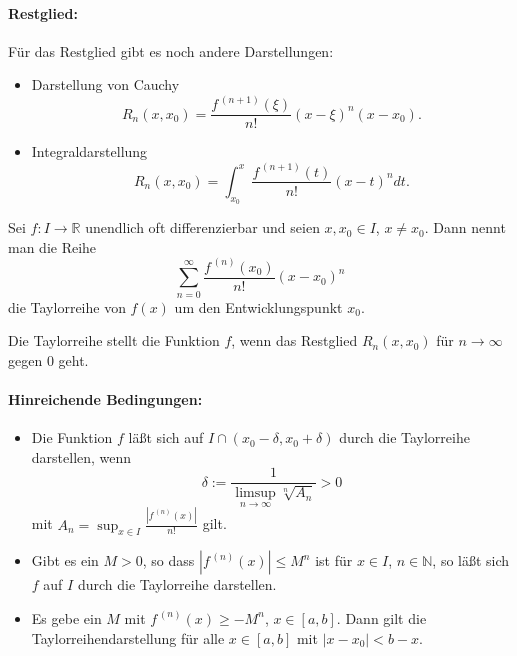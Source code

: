 \documentclass[a4paper,12pt,DIV15]{scrartcl}
\begin{document}
\paragraph{Restglied:}
Für das Restglied gibt es noch andere Darstellungen:
\begin{itemize}
\item Darstellung von {\color{red}Cauchy}
\[ R_n(x,x_0)= \frac{f^{\,(n+1)}(\xi)}{n!} (x- \xi)^{n}(x-x_0).\]
\item {\color{red}Integraldarstellung}
\[ R_n(x,x_0)= \int_{x_0}^x \frac{f^{\,(n+1)}(t)}{n!}  (x-t)^n dt.\]
\end{itemize}

\begin{defn}[Taylorreihe]
Sei $f:I \rightarrow \mathbb{R}$ unendlich oft  differenzierbar und seien
$x,x_0 \in I$, $x \neq x_0$. Dann nennt man die Reihe
\[ \sum_{n=0}^\infty \frac{f^{\,(n)}(x_0)}{n!}(x-x_0)^n \]
die {\color{red} Taylorreihe} von $f(x)$ um den Entwicklungspunkt
{\color{red} $x_0$}.

\bigskip
Die Taylorreihe stellt die Funktion $f$, wenn das Restglied $R_n(x,x_0)$ für $n
\rightarrow \infty$ gegen $0$ geht.
\end{defn}

\paragraph{Hinreichende Bedingungen:}
\begin{itemize}
\item Die Funktion $f$ läßt sich auf $I\cap (x_0-\delta, x_0+\delta)$ durch die Taylorreihe darstellen, wenn
\[
\delta:= \frac{1}{\limsup_{n \rightarrow \infty} \sqrt[n]{A_n}}>0
 \]
mit $A_n=\sup_{x \in I}  \frac{|f^{\,(n)}(x)|}{n!}$ gilt.
\item Gibt es ein $M>0$, so dass $|f^{\,(n)}(x)|\leq M^n$ ist für $x \in
I$, $n \in \mathbb{N}$, so läßt sich $f$ auf $I$ durch die Taylorreihe
darstellen.
\item Es gebe ein $M$ mit  $f^{\,(n)}(x)\geq -M^n$, $x \in [a,b]$. Dann
gilt die Taylorreihendarstellung für alle $x \in [a,b]$ mit
$|x-x_0|<b-x$. 
\end{itemize}
\end{document}
